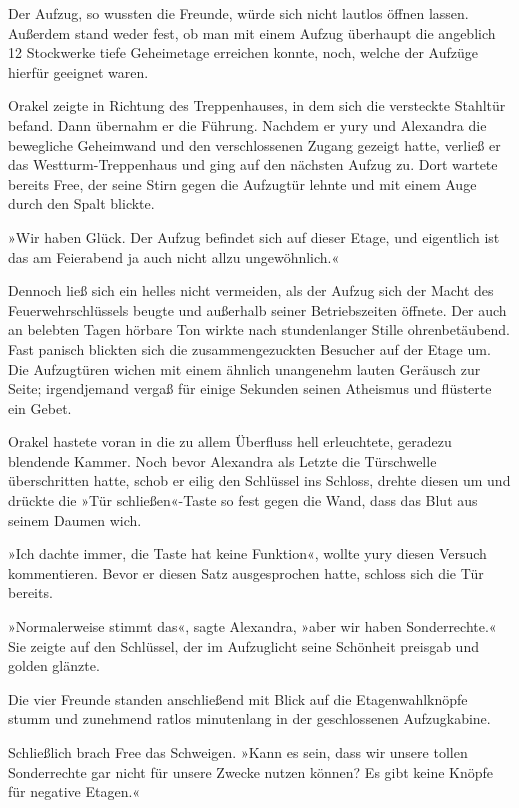 Der Aufzug, so wussten die Freunde, würde sich nicht lautlos öffnen lassen. Außerdem stand weder fest, ob man mit einem Aufzug überhaupt die angeblich 12 Stockwerke tiefe Geheimetage erreichen konnte, noch, welche der Aufzüge hierfür geeignet waren.

Orakel zeigte in Richtung des Treppenhauses, in dem sich die versteckte Stahltür befand. Dann übernahm er die Führung. Nachdem er yury und Alexandra die bewegliche Geheimwand und den verschlossenen Zugang gezeigt hatte, verließ er das Westturm-Treppenhaus und ging auf den nächsten Aufzug zu. Dort wartete bereits Free, der seine Stirn gegen die Aufzugtür lehnte und mit einem Auge durch den Spalt blickte.

»Wir haben Glück. Der Aufzug befindet sich auf dieser Etage, und eigentlich ist das am Feierabend ja auch nicht allzu ungewöhnlich.«

Dennoch ließ sich ein helles  nicht vermeiden, als der Aufzug sich der Macht des Feuerwehrschlüssels beugte und außerhalb seiner Betriebszeiten öffnete. Der auch an belebten Tagen hörbare Ton wirkte nach stundenlanger Stille ohrenbetäubend. Fast panisch blickten sich die zusammengezuckten Besucher auf der Etage um. Die Aufzugtüren wichen mit einem ähnlich unangenehm lauten Geräusch zur Seite; irgendjemand vergaß für einige Sekunden seinen Atheismus und flüsterte ein Gebet.

Orakel hastete voran in die zu allem Überfluss hell erleuchtete, geradezu blendende Kammer. Noch bevor Alexandra als Letzte die Türschwelle überschritten hatte, schob er eilig den Schlüssel ins Schloss, drehte diesen um und drückte die »Tür schließen«-Taste so fest gegen die Wand, dass das Blut aus seinem Daumen wich.

»Ich dachte immer, die Taste hat keine Funktion«, wollte yury diesen Versuch kommentieren. Bevor er diesen Satz ausgesprochen hatte, schloss sich die Tür bereits.

»Normalerweise stimmt das«, sagte Alexandra, »aber wir haben Sonderrechte.« Sie zeigte auf den Schlüssel, der im Aufzuglicht seine Schönheit preisgab und golden glänzte.

Die vier Freunde standen anschließend mit Blick auf die Etagenwahlknöpfe stumm und zunehmend ratlos minutenlang in der geschlossenen Aufzugkabine.

Schließlich brach Free das Schweigen. »Kann es sein, dass wir unsere tollen Sonderrechte gar nicht für unsere Zwecke nutzen können? Es gibt keine Knöpfe für negative Etagen.«

